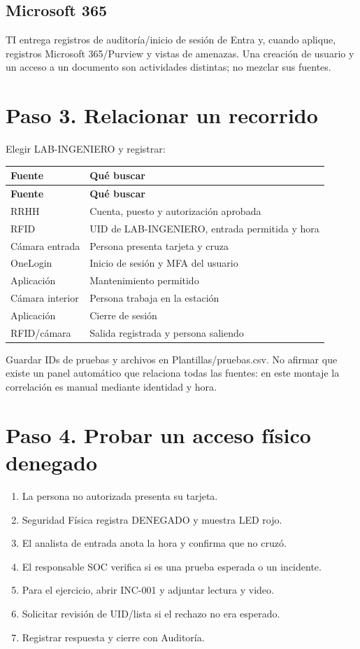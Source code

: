 \documentclass[12pt,a4paper]{article}
\begin{document}
\subsection*{Microsoft 365}
TI entrega registros de auditoría/inicio de sesión de Entra y, cuando aplique, registros Microsoft 365/Purview y vistas de amenazas. Una creación de usuario y un acceso a un documento son actividades distintas; no mezclar sus fuentes.\par
{}\section*{Paso 3. Relacionar un recorrido}
Elegir LAB-INGENIERO y registrar:\par
{\small\renewcommand{\arraystretch}{1.2}
\begin{longtable}{p{7.760cm}p{7.760cm}}
\toprule
\textbf{Fuente} & \textbf{Qué buscar} \\ \midrule\endfirsthead
\textbf{Fuente} & \textbf{Qué buscar} \\ \midrule\endhead
RRHH & Cuenta, puesto y autorización aprobada \\
RFID & UID de LAB-INGENIERO, entrada permitida y hora \\
Cámara entrada & Persona presenta tarjeta y cruza \\
OneLogin & Inicio de sesión y MFA del usuario \\
Aplicación & Mantenimiento permitido \\
Cámara interior & Persona trabaja en la estación \\
Aplicación & Cierre de sesión \\
RFID/cámara & Salida registrada y persona saliendo \\
\bottomrule\end{longtable}}
Guardar IDs de pruebas y archivos en \textnormal{Plantillas/\allowbreak{}pruebas.csv}. No afirmar que existe un panel automático que relaciona todas las fuentes: en este montaje la correlación es manual mediante identidad y hora.\par
{}\section*{Paso 4. Probar un acceso físico denegado}
\begin{enumerate}
\item La persona no autorizada presenta su tarjeta.
\item Seguridad Física registra DENEGADO y muestra LED rojo.
\item El analista de entrada anota la hora y confirma que no cruzó.
\item El responsable SOC verifica si es una prueba esperada o un incidente.
\item Para el ejercicio, abrir INC-001 y adjuntar lectura y video.
\item Solicitar revisión de UID/lista si el rechazo no era esperado.
\item Registrar respuesta y cierre con Auditoría.
\end{enumerate}
\end{document}
